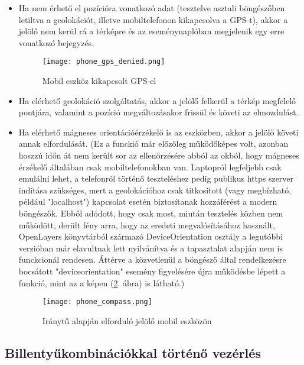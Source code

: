\begin{itemize}

  \item Ha nem érhető el pozícióra vonatkozó adat (tesztelve asztali
  böngészőben letiltva a geolokációt, illetve mobiltelefonon kikapcsolva a
  GPS-t), akkor a jelölő nem kerül rá a térképre és az eseménynaplóban
  megjelenik egy erre vonatkozó bejegyzés.
  \begin{figure}[H]
    \texttt{[image: phone\_gps\_denied.png]}
    \caption{Mobil eszköz kikapcsolt GPS-el}
    \label{fig:phone_gps_denied}
  \end{figure}

  \item Ha elérhető geolokáció szolgáltatás, akkor a jelölő felkerül a térkép
  megfelelő pontjára, valamint a pozíció megváltozásakor frissül és követi az
  elmozdulást.

  \item Ha elérhető mágneses orientációérzékelő is az eszközben, akkor a jelölő
  követi annak elfordulását.
  (Ez a funckió már előzőleg működőképes volt, azonban hoszzú időn át nem került
  sor az ellenőrzésére abból az okból, hogy mágneses érzékelő általában csak
  mobiltelefonokban van. Laptopról legfeljebb csak emulálni lehet, a telefonról
  történő teszteléshez pedig publikus https szerver indítása szükséges, mert a
  geolokációhoz csak titkosított (vagy megbízható, például "localhost")
  kapcsolat esetén biztosítanak hozzáférést a modern böngészők. Ebből adódott,
  hogy csak most, miután tesztelés közben nem működött, derült fény arra, hogy
  az eredeti megvalósításához használt, OpenLayers könyvtárból származó
  DeviceOrientation osztály a legutóbbi verzióban már elavultnak lett
  nyilvánítva és a tapasztalat alapján nem is funckcionál rendesen. Áttérve a
  közvetlenül a böngésző által rendelkezésre bocsátott "deviceorientation"
  esemény figyelésére újra működésbe lépett a funkció, mint az a képen
  (\ref{fig:phone_compass}. ábra) is látható.)

  \begin{figure}[H]
    \texttt{[image: phone\_compass.png]}
    \caption{Iránytű alapján elforduló jelölő mobil eszközön}
    \label{fig:phone_compass}
  \end{figure}

\end{itemize}


\subsection{Billentyűkombinációkkal történő vezérlés}

